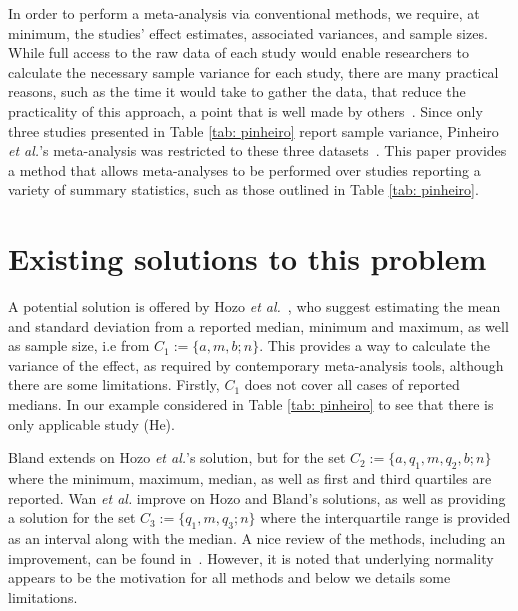 \documentclass{article}
\begin{document}
In order to perform a meta-analysis via conventional methods, we require, at minimum, the studies' effect estimates, associated variances, and sample sizes. While full access to the raw data of each study would enable researchers to calculate the necessary sample variance for each study, there are many practical reasons, such as the time it would take to gather the data, that reduce the practicality of this approach, a point that is well made by others~\cite[e.g., p. 57]{blandEstimatingMeanStandard2014}.   Since only three studies presented in Table \ref{tab: pinheiro} report sample variance, Pinheiro \emph{et al.}'s meta-analysis was restricted to these three datasets~\cite{pinheiroDdimerPreeclampsiaSystematic2012}. This paper provides a method that allows meta-analyses to be performed over studies reporting a variety of summary statistics, such as those outlined in Table \ref{tab: pinheiro}.

\section{Existing solutions to this problem} \label{sec: prev methods}


A potential solution is offered by Hozo \emph{et al.}~\cite{hozoEstimatingMeanVariance2005}, who suggest estimating the mean and standard deviation from a reported median, minimum and maximum, as well as sample size, i.e from $C_1:=\{a, m, b; n\}$. This provides a way to calculate the variance of the effect, as required by contemporary meta-analysis tools, although there are some limitations. Firstly, $C_1$ does not cover all cases of reported medians. In our example considered in Table \ref{tab: pinheiro} to see that there is only applicable study (He).

Bland extends on Hozo \emph{et al.}'s solution, but for the set $C_2 := \{a, q_1, m, q_2, b; n\}$ where the minimum, maximum, median, as well as first and third quartiles are reported\cite{blandEstimatingMeanStandard2014}. Wan \emph{et al.} improve on Hozo and Bland's solutions, as well as providing a solution for the set $C_3 := \{q_1, m, q_3; n\}$ where the interquartile range is provided as an interval along with the median\cite{wanEstimatingSampleMean2014}.  A nice review of the methods, including an improvement, can be found in~\cite{shi2018estimate}.  However, it is noted that underlying normality appears to be the motivation for all methods and below we details some limitations.
\end{document}
